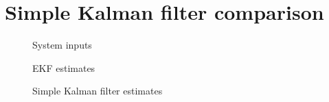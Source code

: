 \documentclass[class=article, crop=false]{standalone}
\begin{document}
\section{Simple Kalman filter comparison}\label{sec:exp-comp}


\begin{figure}
    
    
    \caption{System inputs}
\end{figure}

\begin{figure}
    
    
    \caption{EKF estimates}
\end{figure}

\begin{figure}
    
    
    \caption{Simple Kalman filter estimates}
\end{figure}
\end{document}
